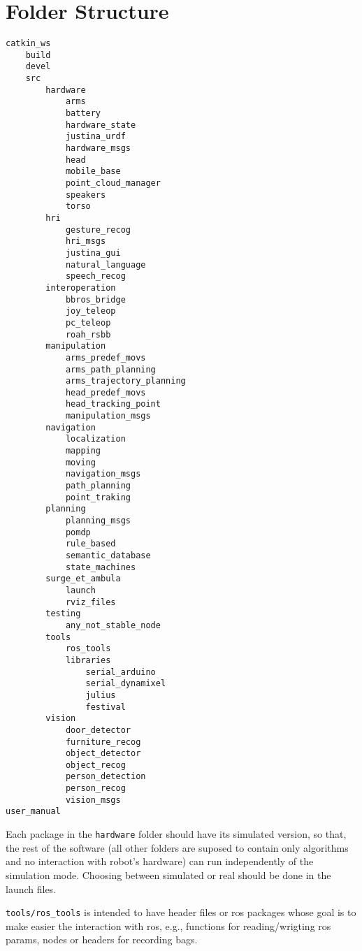\documentclass[letterpaper,10pt]{article}
\begin{document}
\section{Folder Structure}

\begin{verbatim}
catkin_ws
    build
    devel
    src
        hardware
            arms
            battery
            hardware_state
            justina_urdf
            hardware_msgs
            head
            mobile_base
            point_cloud_manager
            speakers
            torso
        hri
            gesture_recog
            hri_msgs
            justina_gui
            natural_language
            speech_recog
        interoperation
            bbros_bridge
            joy_teleop
            pc_teleop
            roah_rsbb
        manipulation
            arms_predef_movs
            arms_path_planning
            arms_trajectory_planning
            head_predef_movs
            head_tracking_point
            manipulation_msgs
        navigation
            localization
            mapping
            moving
            navigation_msgs
            path_planning
            point_traking
        planning
            planning_msgs
            pomdp
            rule_based
            semantic_database
            state_machines
        surge_et_ambula
            launch
            rviz_files
        testing
            any_not_stable_node
        tools
            ros_tools
            libraries
                serial_arduino
                serial_dynamixel
                julius
                festival
        vision
            door_detector
            furniture_recog
            object_detector
            object_recog
            person_detection
            person_recog
            vision_msgs
user_manual
\end{verbatim}


Each package in the \texttt{hardware} folder should have its simulated version, so that, the rest of the software (all other folders are suposed to contain only algorithms and no interaction with robot's hardware) can run independently of the simulation mode. Choosing between simulated or real should be done in the launch files. 

\texttt{tools/ros\_tools} is intended to have header files or ros packages whose goal is to make easier the interaction with ros, e.g., functions for reading/wrigting ros params, nodes or headers for recording bags. 


\end{document}
